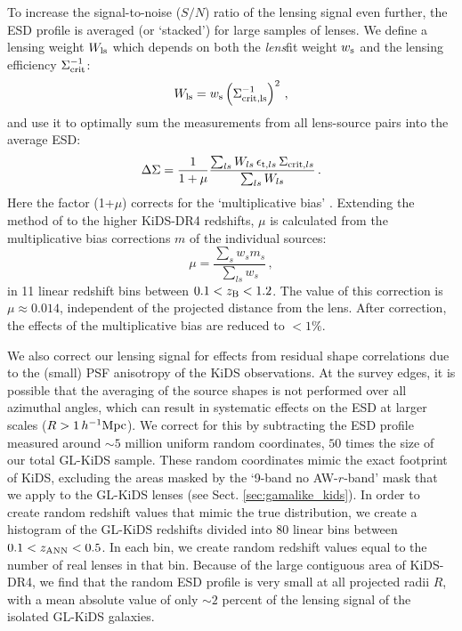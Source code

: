 \documentclass[usenatbib]{mnras}
\newcommand{\hMpc}{\, h^{-1}{\rm{Mpc}} }
\newcommand{\un}[1]{_{\rm #1}}
\begin{document}
To increase the signal-to-noise ($S/N$) ratio of the lensing signal even further, the ESD profile is averaged (or `stacked') for large samples of lenses. We define a lensing weight $W\un{ls}$ which depends on both the \emph{lens}fit weight $w\un{s}$ and the lensing efficiency $\Sigma\un{crit}^{-1}$:
\begin{equation}
	W\un{ls} = w\un{s} \left( \Sigma\un{crit,ls}^{-1} \right)^2 \, ,
	\label{eq:weights}
\end{equation}
and use it to optimally sum the measurements from all lens-source pairs into the average ESD:
\begin{equation}
	\Delta\Sigma = \frac{1}{1+\mu} \frac{\sum_{ls} W_{ls} \, \epsilon_{{\rm t},ls} \, \Sigma_{{\rm crit},ls} }{ \sum_{ls}{W_{ls}} }  \, .
	\label{eq:ESDmeasured}
\end{equation}
Here the factor (1+$\mu$) corrects for the `multiplicative bias' \cite[]{fenechconti2017}. Extending the method of \cite{dvornik2017} to the higher KiDS-DR4 redshifts, $\mu$ is calculated from the multiplicative bias corrections $m$ of the individual sources:
\begin{equation}
	\mu=\frac{\sum_{s} w_{s} m_{s}}{\sum_{ls} w_{s}} \, ,
	\label{eq:biascorr}
\end{equation}
in 11 linear redshift bins between \mbox{$0.1<z\un{B}<1.2$}. The value of this correction is $\mu\approx0.014$, independent of the projected distance from the lens. After correction, the effects of the multiplicative bias are reduced to $<1\%$.

We also correct our lensing signal for effects from residual shape correlations due to the (small) PSF anisotropy of the KiDS observations. At the survey edges, it is possible that the averaging of the source shapes is not performed over all azimuthal angles, which can result in systematic effects on the ESD at larger scales ($R>1\hMpc$). We correct for this by subtracting the ESD profile measured around $\sim5$ million uniform random coordinates, $50$ times the size of our total GL-KiDS sample. These random coordinates mimic the exact footprint of KiDS, excluding the areas masked by the `9-band no AW-$r$-band' mask that we apply to the GL-KiDS lenses (see Sect. \ref{sec:gamalike_kids}). In order to create random redshift values that mimic the true distribution, we create a histogram of the GL-KiDS redshifts divided into $80$ linear bins between $0.1<z\un{ANN}<0.5$. In each bin, we create random redshift values equal to the number of real lenses in that bin. Because of the large contiguous area of KiDS-DR4, we find that the random ESD profile is very small at all projected radii $R$, with a mean absolute value of only $\sim2$ percent of the lensing signal of the isolated GL-KiDS galaxies. 
\end{document}
